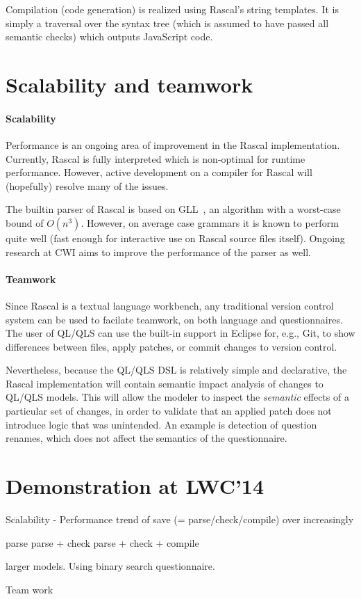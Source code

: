 \documentclass[a4paper]{article}
\begin{document}
Compilation (code generation) is realized using Rascal's string
templates. It is simply a traversal over the syntax tree (which is
assumed to have passed all semantic checks) which outputs JavaScript
code. 



\section{Scalability and teamwork}

\paragraph{Scalability}
Performance is an ongoing area of improvement in the Rascal
implementation. Currently, Rascal is fully interpreted which is
non-optimal for runtime performance. However, active development on
a compiler for Rascal will (hopefully) resolve many of the issues. 

The builtin parser of Rascal is based on GLL~\cite{GLLPTGEN}, an
algorithm with a worst-case bound of $O(n^3)$. However, on average
case grammars it is known to perform quite well (fast enough for
interactive use on Rascal source files itself). Ongoing research at
CWI aims to improve the performance of the parser as well.


\paragraph{Teamwork}
Since Rascal is a textual language workbench, any traditional version
control system can be used to facilate teamwork, on both language and
questionnaires. The user of QL/QLS can use the built-in support in
Eclipse for, e.g., Git, to show differences between files, apply
patches, or commit changes to version control. 

Nevertheless, because the QL/QLS DSL is relatively simple and
declarative, the Rascal implementation will contain semantic impact
analysis of changes to QL/QLS models. This will allow the modeler to
inspect the \textit{semantic} effects of a particular set of changes,
in order to validate that an applied patch does not introduce logic
that was unintended. An example is detection of question renames,
which does not affect the semantics of the questionnaire.

\section{Demonstration at LWC'14}



Scalability
- Performance trend of save (= parse/check/compile) over increasingly

parse 
parse + check
parse + check + compile

 
larger models. Using binary search questionnaire.


Team work



\end{document}
